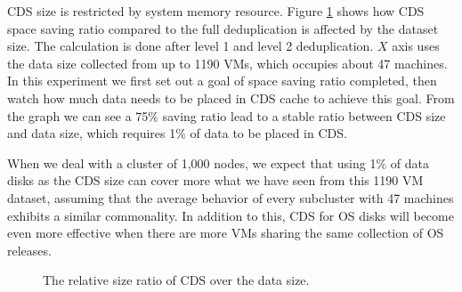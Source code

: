 CDS size is restricted by system memory resource.
Figure \ref{fig:datacds} shows how CDS space saving ratio
compared to the full deduplication is affected by the dataset size. 
The calculation is done after level 1 and level 2 deduplication.
$X$ axis uses the data size collected  from up to 1190 VMs, which occupies about
47 machines. 
In this experiment we first set out a goal of space saving ratio completed, 
then watch how much data needs to be placed in CDS cache to achieve this goal.
From the graph we can see a 75\% saving ratio lead to a stable ratio between 
CDS size and data size, which requires 1\% of data to be placed in CDS.

When we deal with a cluster of 1,000 nodes, we expect that using
1\% of data disks as the CDS size can cover more what we have seen from this
1190 VM dataset, assuming that the average behavior of every subcluster with 47 machines
exhibits a similar commonality. 
In addition to this, CDS for OS disks will become even more effective when
there are more VMs sharing the same collection of OS releases. 

\begin{figure}
  \centering
  \caption{The relative size ratio of  CDS over the data size. }
  \label{fig:datacds}
\end{figure}

